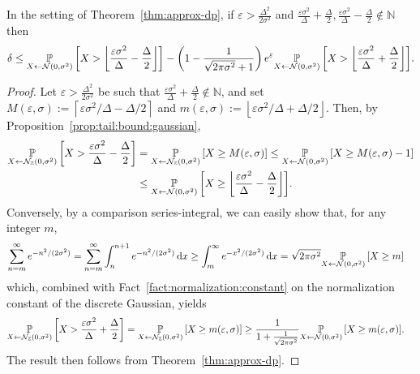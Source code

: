 \documentclass{jpcfinal} %
\newcommand{\dgausss}[2]{{\discN\left(#1,#2\right)}}
\newcommand{\dgauss}[1]{\dgausss{0}{#1}}
\newcommand{\pr}[2]{{\ifx&#1& \mathbb{P} \else
\underset{#1}{\mathbb{P}} \fi \left[#2\right]}}
\newcommand{\eqdef}{:=}
\newcommand{\eps}{\varepsilon}
\newcommand{\dx}[1][x]{\mathrm{d}#1}
\begin{document}
\begin{lem}
In the setting of Theorem~\ref{thm:approx-dp}, if $\eps > \frac{\Delta^2}{2\sigma^2}$ and $\frac{\eps\sigma^2}{\Delta}+\frac{\Delta}{2},\frac{\eps\sigma^2}{\Delta}-\frac{\Delta}{2}\notin \mathbb{N}$ then
\begin{equation}
\delta \le \pr{X \gets \mathcal{N}(0,\sigma^2)}{ X > \left\lfloor \frac{\eps\sigma^2}{\Delta}-\frac{\Delta}{2} \right\rfloor }-\left(1-\frac{1}{\sqrt{2\pi\sigma^2}+1}\right)e^\eps\pr{X \gets \mathcal{N}(0,\sigma^2)}{X > \left\lfloor \frac{\eps\sigma^2}{\Delta}+\frac{\Delta}{2} \right\rfloor }.
\end{equation}
\end{lem}
\begin{proof}
Let $\eps > \frac{\Delta^2}{2\sigma^2}$ be such that $\frac{\eps\sigma^2}{\Delta}+\frac{\Delta}{2}\notin \mathbb{N}$, and set $M(\eps,\sigma) \eqdef \left\lceil {\eps\sigma^2}/{\Delta}-{\Delta}/{2} \right\rceil$ and $m(\eps,\sigma) \eqdef \left\lfloor {\eps\sigma^2}/{\Delta}+{\Delta}/{2} \right\rfloor$. Then, by Proposition~\ref{prop:tail:bound:gaussian},
\begin{align*}
    \pr{X \gets \dgauss{\sigma^2}}{ X > \frac{\eps\sigma^2}{\Delta}-\frac{\Delta}{2} }
    &= \pr{X \gets \dgauss{\sigma^2}}{ X \geq M(\eps,\sigma) }
    \leq \pr{X \gets \mathcal{N}(0,\sigma^2)}{ X \geq M(\eps,\sigma)-1 } \\
    &\leq \pr{X \gets \mathcal{N}(0,\sigma^2)}{ X \geq \left\lfloor \frac{\eps\sigma^2}{\Delta}-\frac{\Delta}{2} \right\rfloor }.
\end{align*}
Conversely, by a comparison series-integral, we can easily show that, for any integer $m$,
\begin{align*}
\sum_{n=m}^\infty e^{-n^2/(2\sigma^2)}
&= \sum_{n=m}^\infty \int_{n}^{n+1} e^{-n^2/(2\sigma^2)}\,\dx
\geq \int_{m}^\infty e^{-x^2/(2\sigma^2)}\,\dx
= \sqrt{2\pi\sigma^2}\pr{X \gets \mathcal{N}(0,\sigma^2)}{ X \geq m }
\end{align*}
which, combined with Fact~\ref{fact:normalization:constant} on the normalization constant of the discrete Gaussian, yields
\begin{align*}
    \pr{X \gets \dgauss{\sigma^2}}{ X > \frac{\eps\sigma^2}{\Delta}+\frac{\Delta}{2} }
    &= \pr{X \gets \dgauss{\sigma^2}}{ X \geq m(\eps,\sigma) }
    \geq \frac{1}{1+\frac{1}{\sqrt{2\pi\sigma^2}}}\pr{X \gets \mathcal{N}(0,\sigma^2)}{ X \geq m(\eps,\sigma) }.
\end{align*}
The result then follows from Theorem~\ref{thm:approx-dp}.
\end{proof}
\end{document}
